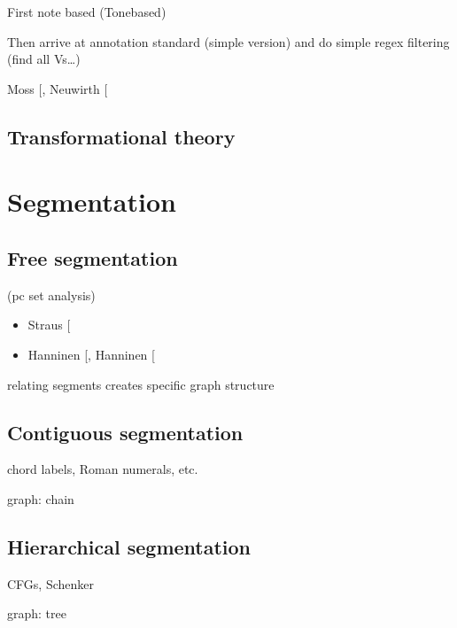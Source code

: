\documentclass[letterpaper,10pt,english]{sphinxmanual}
\begin{document}
First note based (Tone\sphinxhyphen{}based)

Then arrive at annotation standard (simple version)
and do simple regex filtering (find all Vs…)

Moss  {[}\sphinxcite{8_bibliography:id21}{]}, Neuwirth  {[}\sphinxcite{8_bibliography:id33}{]}


\section{Transformational theory}
\label{\detokenize{4_harmony:transformational-theory}}

\chapter{Segmentation}
\label{\detokenize{5_segmentation:segmentation}}\label{\detokenize{5_segmentation::doc}}

\section{Free segmentation}
\label{\detokenize{5_segmentation:free-segmentation}}
(pc set analysis)
\begin{itemize}
\item {} 
Straus {[}\sphinxcite{8_bibliography:id3}{]}

\item {} 
Hanninen {[}\sphinxcite{8_bibliography:id19}{]}, Hanninen {[}\sphinxcite{8_bibliography:id20}{]}

\end{itemize}

relating segments creates specific graph structure


\section{Contiguous segmentation}
\label{\detokenize{5_segmentation:contiguous-segmentation}}
chord labels, Roman numerals, etc.

graph: chain


\section{Hierarchical segmentation}
\label{\detokenize{5_segmentation:hierarchical-segmentation}}
CFGs, Schenker

graph: tree
\end{document}
